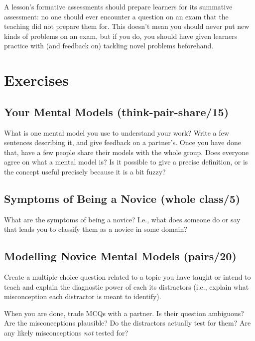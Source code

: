 A lesson's formative assessments should prepare learners for its
summative assessment: no one should ever encounter a question on an exam
that the teaching did not prepare them for. This doesn't mean you should
never put new kinds of problems on an exam, but if you do, you should
have given learners practice with (and feedback on) tackling novel
problems beforehand.

\section{Exercises}\label{s:models-exercises}

\subsection{Your Mental Models (think-pair-share/15)}\label{your-mental-models-think-pair-share15}

What is one mental model you use to understand your work? Write a few
sentences describing it, and give feedback on a partner's. Once you have
done that, have a few people share their models with the whole group.
Does everyone agree on what a mental model is? Is it possible to give a
precise definition, or is the concept useful precisely because it is a
bit fuzzy?

\subsection{Symptoms of Being a Novice (whole class/5)}\label{symptoms-of-being-a-novice-whole-class5}

What are the symptoms of being a novice? I.e., what does someone do or
say that leads you to classify them as a novice in some domain?

\subsection{Modelling Novice Mental Models (pairs/20)}\label{modelling-novice-mental-models-pairs20}

Create a multiple choice question related to a topic you have taught or
intend to teach and explain the diagnostic power of each its distractors
(i.e., explain what misconception each distractor is meant to identify).

When you are done, trade MCQs with a partner. Is their question
ambiguous? Are the misconceptions plausible? Do the distractors actually
test for them? Are any likely misconceptions \emph{not} tested for?

